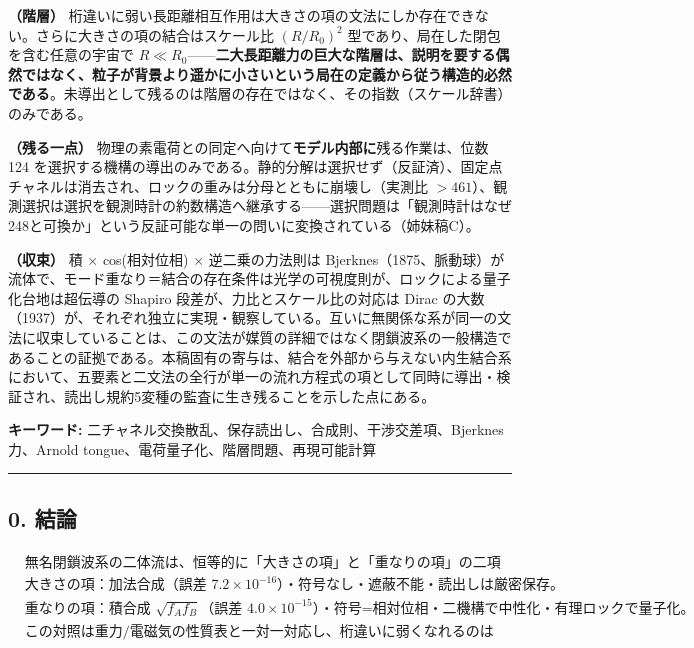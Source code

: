 \documentclass[
  a4paper,
]{ltjsarticle}
\begin{document}
\textbf{（階層）}
桁違いに弱い長距離相互作用は大きさの項の文法にしか存在できない。さらに大きさの項の結合はスケール比
\((R/R_0)^2\) 型であり、局在した閉包を含む任意の宇宙で
\(R\ll R_0\)------\textbf{二大長距離力の巨大な階層は、説明を要する偶然ではなく、粒子が背景より遥かに小さいという局在の定義から従う構造的必然である}。未導出として残るのは階層の存在ではなく、その指数（スケール辞書）のみである。

\textbf{（残る一点）}
物理の素電荷との同定へ向けて\textbf{モデル内部に}残る作業は、位数 124
を選択する機構の導出のみである。静的分解は選択せず（反証済）、固定点チャネルは消去され、ロックの重みは分母とともに崩壊し（実測比
\(>461\)）、観測選択は選択を観測時計の約数構造へ継承する------選択問題は「観測時計はなぜ248と可換か」という反証可能な単一の問いに変換されている（姉妹稿C）。

\textbf{（収束）} 積 × cos(相対位相) × 逆二乗の力法則は
Bjerknes（1875、脈動球）が流体で、モード重なり＝結合の存在条件は光学の可視度則が、ロックによる量子化台地は超伝導の
Shapiro 段差が、力比とスケール比の対応は Dirac
の大数（1937）が、それぞれ独立に実現・観察している。互いに無関係な系が同一の文法に収束していることは、この文法が媒質の詳細ではなく閉鎖波系の一般構造であることの証拠である。本稿固有の寄与は、結合を外部から与えない内生結合系において、五要素と二文法の全行が単一の流れ方程式の項として同時に導出・検証され、読出し規約5変種の監査に生き残ることを示した点にある。

\textbf{キーワード:}
二チャネル交換散乱、保存読出し、合成則、干渉交差項、Bjerknes 力、Arnold
tongue、電荷量子化、階層問題、再現可能計算

\begin{center}\rule{0.5\linewidth}{0.5pt}\end{center}

\subsection{0. 結論}\label{ux7d50ux8ad6}

\[
\boxed{
\begin{aligned}
&\text{無名閉鎖波系の二体流は、恒等的に「大きさの項」と「重なりの項」の二項に分解され、第三の項はない。}\\
&\text{大きさの項：加法合成（誤差 }7.2\times10^{-16}\text{）・符号なし・遮蔽不能・読出しは厳密保存。}\\
&\text{重なりの項：積合成 }\sqrt{f_Af_B}\text{（誤差 }4.0\times10^{-15}\text{）・符号=相対位相・二機構で中性化・有理ロックで量子化。}\\
&\text{この対照は重力/電磁気の性質表と一対一対応し、桁違いに弱くなれるのは大きさの項のみである。}
\end{aligned}
}
\]
\end{document}
